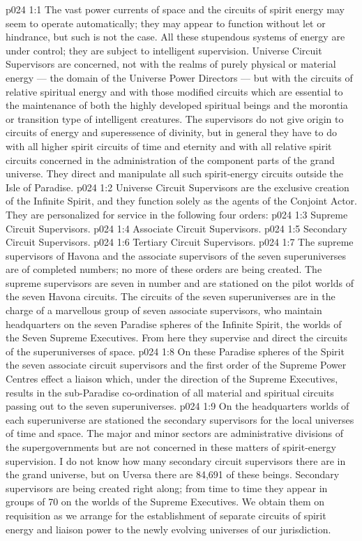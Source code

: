 \vs p024 1:1 The vast power currents of space and the circuits of spirit energy may seem to operate automatically; they may appear to function without let or hindrance, but such is not the case. All these stupendous systems of energy are under control; they are subject to intelligent supervision. Universe Circuit Supervisors are concerned, not with the realms of purely physical or material energy --- the domain of the Universe Power Directors --- but with the circuits of relative spiritual energy and with those modified circuits which are essential to the maintenance of both the highly developed spiritual beings and the morontia or transition type of intelligent creatures. The supervisors do not give origin to circuits of energy and superessence of divinity, but in general they have to do with all higher spirit circuits of time and eternity and with all relative spirit circuits concerned in the administration of the component parts of the grand universe. They direct and manipulate all such spirit\hyp{}energy circuits outside the Isle of Paradise.
\vs p024 1:2 \pc Universe Circuit Supervisors are the exclusive creation of the Infinite Spirit, and they function solely as the agents of the Conjoint Actor. They are personalized for service in the following four orders:
\vs p024 1:3 \bibnobreakspace Supreme Circuit Supervisors.
\vs p024 1:4 \bibnobreakspace Associate Circuit Supervisors.
\vs p024 1:5 \bibnobreakspace Secondary Circuit Supervisors.
\vs p024 1:6 \bibnobreakspace Tertiary Circuit Supervisors.
\vs p024 1:7 \pc The supreme supervisors of Havona and the associate supervisors of the seven superuniverses are of completed numbers; no more of these orders are being created. The supreme supervisors are seven in number and are stationed on the pilot worlds of the seven Havona circuits. The circuits of the seven superuniverses are in the charge of a marvellous group of seven associate supervisors, who maintain headquarters on the seven Paradise spheres of the Infinite Spirit, the worlds of the Seven Supreme Executives. From here they supervise and direct the circuits of the superuniverses of space.
\vs p024 1:8 On these Paradise spheres of the Spirit the seven associate circuit supervisors and the first order of the Supreme Power Centres effect a liaison which, under the direction of the Supreme Executives, results in the sub\hyp{}Paradise co\hyp{}ordination of all material and spiritual circuits passing out to the seven superuniverses.
\vs p024 1:9 On the headquarters worlds of each superuniverse are stationed the secondary supervisors for the local universes of time and space. The major and minor sectors are administrative divisions of the supergovernments but are not concerned in these matters of spirit\hyp{}energy supervision. I do not know how many secondary circuit supervisors there are in the grand universe, but on Uversa there are 84,691 of these beings. Secondary supervisors are being created right along; from time to time they appear in groups of 70 on the worlds of the Supreme Executives. We obtain them on requisition as we arrange for the establishment of separate circuits of spirit energy and liaison power to the newly evolving universes of our jurisdiction.
